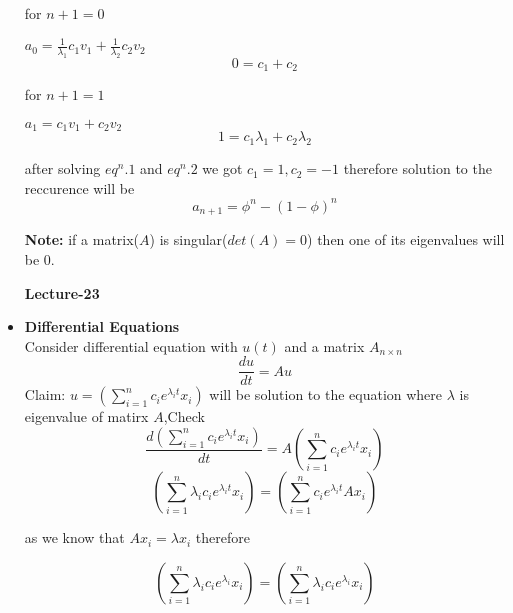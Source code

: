 \documentclass[a4paper,11pt]{article}
\numberwithin{equation}{section}
\begin{document}
\begin{itemize}
for $n+1=0$
\begin{center}
    $a_0=\frac{1}{\lambda_1}c_1v_1+\frac{1}{\lambda_2}c_2v_2$
    \begin{equation} 0=c_1+c_2 \tag{$eq^n$.1}\end{equation}
\end{center}
for $n+1=1$
\begin{center}
    $a_1=c_1v_1+c_2v_2$
    \begin{equation} 1=c_1\lambda_1+c_2\lambda_2 \tag{$eq^n$.2}\end{equation}
\end{center}

after solving $eq^n.1$ and $eq^n.2$ we got $c_1=1,c_2=-1$ therefore solution to the reccurence will be
\begin{equation}
    a_{n+1}={\phi^n-(1-\phi)^n} \tag{Pingala Sequence}
\end{equation}

\textbf{Note: }if a matrix($A$) is singular($det(A)=0$) then one of its eigenvalues will be 0.\\

\begin{center}
    \Huge{\textbf{Lecture-23}}
\end{center}
\vspace{5pt}

\item \textbf{Differential Equations}\\

Consider differential equation with $u(t)$ and a matrix $A_{n\times n}$
\begin{equation}
    \frac{du}{dt}=Au \tag{standard DE}
\end{equation}
Claim: \begin{math}
    u=\left(\sum_{i=1}^{n}c_ie^{{\lambda_i}t}x_i\right)
\end{math} will be solution to the equation where $\lambda$ is eigenvalue of matirx $A$,Check
\[
    \frac{d\left(\sum_{i=1}^{n}c_ie^{{\lambda_i}t}x_i\right)}{dt}=A\left(\sum_{i=1}^{n}c_ie^{{\lambda_i}t}x_i\right)
\]
\[
    \left(\sum_{i=1}^{n}\lambda_ic_ie^{{\lambda_i}t}x_i\right)=\left(\sum_{i=1}^{n}c_ie^{{\lambda_i}t}Ax_i\right)
\]

as we know that $Ax_i=\lambda x_i$ therefore

\[
    \left(\sum_{i=1}^{n}\lambda_ic_ie^{{\lambda_i}}x_i\right)=\left(\sum_{i=1}^{n}\lambda_ic_ie^{{\lambda_i}}x_i\right)
\]


\end{itemize}
\end{document}
